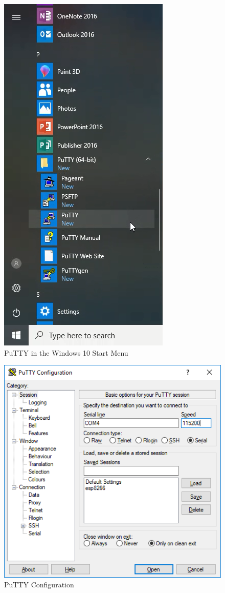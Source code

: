 \documentclass{book}
\makeatletter
\def\maxwidth{\ifdim\Gin@nat@width>\linewidth\linewidth
    \else\Gin@nat@width\fi}
\let\Oldincludegraphics\includegraphics
\renewcommand{\includegraphics}[1]{\Oldincludegraphics[width=.8\maxwidth]{#1}}
\makeatother
\begin{document}
\begin{figure}
\centering
\includegraphics{images/putty_in_start_menu.png}
\caption{PuTTY in the Windows 10 Start Menu}
\end{figure}

\begin{figure}
\centering
\includegraphics{images/putty_config.PNG}
\caption{PuTTY Configuration}
\end{figure}
\end{document}

